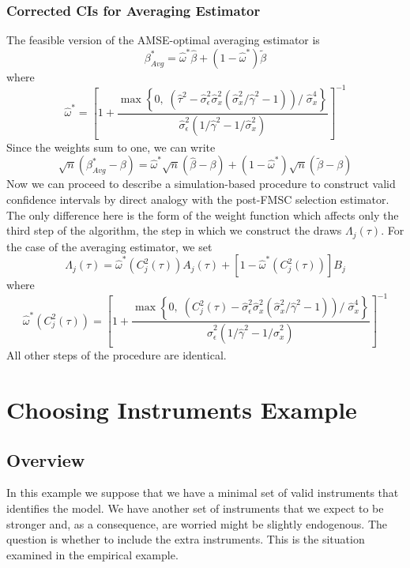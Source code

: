 \documentclass[12pt]{article}
\theoremstyle{definition}
\begin{document}
\subsubsection{Corrected CIs for Averaging Estimator}
The feasible version of the AMSE-optimal averaging estimator is
  $$\beta^*_{Avg} = \widehat{\omega}^* \widehat{\beta} + (1 - \widehat{\omega}^*)\widetilde{\beta}$$
where
$$\widehat{\omega }^* = \left[1 + \frac{\max \left\{0, \; \left(\widehat{\tau}^2 - \widehat{\sigma}_\epsilon^2\widehat{\sigma}_x^2  \left(\widehat{\sigma}_x^2/\widehat{\gamma}^2 - 1 \right) \right)/\;\widehat{\sigma}_x^4 \right\}}{\widehat{\sigma}_\epsilon^2 (1/\widehat{\gamma}^2 - 1/\widehat{\sigma}_x^2)}\right]^{-1}$$
Since the weights sum to one, we can write
  $$\sqrt{n}\left(\beta^*_{Avg}  - \beta \right) =\widehat{\omega}^* \sqrt{n}\left(\widehat{\beta} - \beta \right) +(1 - \widehat{\omega}^*) \sqrt{n}\left(\widetilde{\beta}  - \beta \right)$$
Now we can proceed to describe a simulation-based procedure to construct valid confidence intervals by direct analogy with the post-FMSC selection estimator. The only difference here is the form of the weight function which affects only the third step of the algorithm, the step in which we construct the draws $\Lambda_j(\tau)$. For the case of the averaging estimator, we set
  $$\Lambda_j(\tau) = \widehat{\omega}^*(C_j^2(\tau)) A_j(\tau) + \left[1 -  \widehat{\omega}^*(C_j^2(\tau)) \right]B_j$$
where
  $$\widehat{\omega}^*(C_j^2(\tau)) = \left[1 + \frac{\max \left\{0, \; \left(C^2_j(\tau) - \widehat{\sigma}_\epsilon^2\widehat{\sigma}_x^2  \left(\widehat{\sigma}_x^2/\widehat{\gamma}^2 - 1 \right) \right)/\;\widehat{\sigma}_x^4 \right\}}{\widehat{\sigma}_\epsilon^2 (1/\widehat{\gamma}^2 - 1/\widehat{\sigma}_x^2)}\right]^{-1}$$
All other steps of the procedure are identical.

\section{Choosing Instruments Example}

\subsection{Overview}
In this example we suppose that we have a minimal set of valid instruments that identifies the model. We have another set of instruments that we expect to be stronger and, as a consequence, are worried might be slightly endogenous. The question is whether to include the extra instruments. This is the situation examined in the empirical example.
\end{document}
